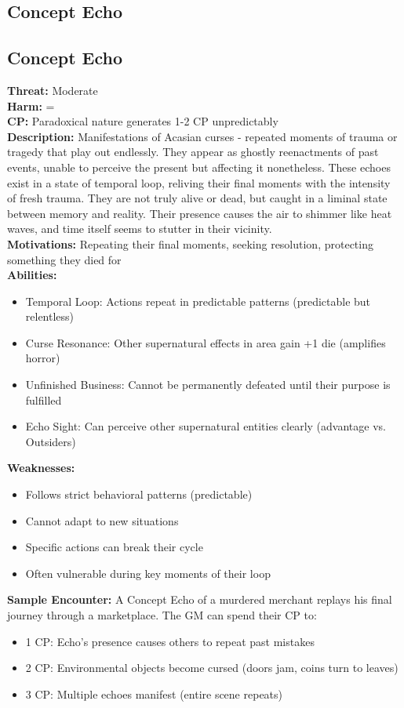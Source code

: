 \documentclass[11pt]{article}
\newenvironment{monsterentry}[1]{%
  \begin{mdframed}[backgroundcolor=shadecolor, linewidth=0pt, leftmargin=0pt, rightmargin=0pt]%
  \subsection*{#1}%
}{%
  \end{mdframed}%
}
\begin{document}
\subsection{Concept Echo}

\begin{monsterentry}{Concept Echo}
\textbf{Threat:} Moderate \\
\textbf{Harm:} = \\
\textbf{CP:} Paradoxical nature generates 1-2 CP unpredictably \\
\textbf{Description:} Manifestations of Acasian curses - repeated moments of trauma or tragedy that play out endlessly. They appear as ghostly reenactments of past events, unable to perceive the present but affecting it nonetheless. These echoes exist in a state of temporal loop, reliving their final moments with the intensity of fresh trauma. They are not truly alive or dead, but caught in a liminal state between memory and reality. Their presence causes the air to shimmer like heat waves, and time itself seems to stutter in their vicinity. \\
\textbf{Motivations:} Repeating their final moments, seeking resolution, protecting something they died for \\
\textbf{Abilities:}
\begin{itemize}
    \item Temporal Loop: Actions repeat in predictable patterns (predictable but relentless)
    \item Curse Resonance: Other supernatural effects in area gain +1 die (amplifies horror)
    \item Unfinished Business: Cannot be permanently defeated until their purpose is fulfilled
    \item Echo Sight: Can perceive other supernatural entities clearly (advantage vs. Outsiders)
\end{itemize}
\textbf{Weaknesses:}
\begin{itemize}
    \item Follows strict behavioral patterns (predictable)
    \item Cannot adapt to new situations
    \item Specific actions can break their cycle
    \item Often vulnerable during key moments of their loop
\end{itemize}
\textbf{Sample Encounter:} A Concept Echo of a murdered merchant replays his final journey through a marketplace. The GM can spend their CP to:
\begin{itemize}
    \item 1 CP: Echo's presence causes others to repeat past mistakes
    \item 2 CP: Environmental objects become cursed (doors jam, coins turn to leaves)
    \item 3 CP: Multiple echoes manifest (entire scene repeats)
\end{itemize}
\end{monsterentry}
\end{document}
